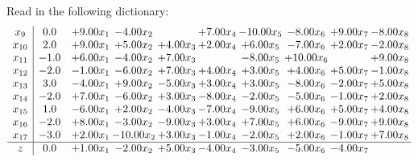 \documentclass[9pt]{article}
\begin{document}
Read in the following dictionary:
\[\begin{array}{c| c c@{\hskip 2pt} c@{\hskip 2pt} c@{\hskip 2pt} c@{\hskip 2pt} c@{\hskip 2pt} c@{\hskip 2pt} c@{\hskip 2pt} c@{\hskip 2pt} }
 x_{9}   &  0.0 & +  9.00 x_{1} & -4.00 x_{2} &   & +  7.00 x_{4} & -10.00 x_{5} & -8.00 x_{6} & +  9.00 x_{7} & -8.00 x_{8}\\
 x_{10}   &  2.0 & +  9.00 x_{1} & +  5.00 x_{2} & +  4.00 x_{3} & +  2.00 x_{4} & +  6.00 x_{5} & -7.00 x_{6} & +  2.00 x_{7} & -2.00 x_{8}\\
 x_{11}   &  -1.0 & +  6.00 x_{1} & -4.00 x_{2} & +  7.00 x_{3} &   & -8.00 x_{5} & + 10.00 x_{6} &   & +  9.00 x_{8}\\
 x_{12}   &  -2.0 & -1.00 x_{1} & -6.00 x_{2} & +  7.00 x_{3} & +  4.00 x_{4} & +  3.00 x_{5} & +  4.00 x_{6} & +  5.00 x_{7} & -1.00 x_{8}\\
 x_{13}   &  3.0 & -4.00 x_{1} & +  9.00 x_{2} & -5.00 x_{3} & +  3.00 x_{4} & +  3.00 x_{5} & -8.00 x_{6} & -2.00 x_{7} & +  5.00 x_{8}\\
 x_{14}   &  -2.0 & +  7.00 x_{1} & -6.00 x_{2} & +  3.00 x_{3} & -8.00 x_{4} & -2.00 x_{5} & -5.00 x_{6} & -1.00 x_{7} & +  2.00 x_{8}\\
 x_{15}   &  1.0 & -6.00 x_{1} & +  2.00 x_{2} & -4.00 x_{3} & -7.00 x_{4} & -9.00 x_{5} & +  6.00 x_{6} & +  5.00 x_{7} & +  4.00 x_{8}\\
 x_{16}   &  -2.0 & +  8.00 x_{1} & -3.00 x_{2} & -9.00 x_{3} & +  3.00 x_{4} & +  7.00 x_{5} & +  6.00 x_{6} & -9.00 x_{7} & +  9.00 x_{8}\\
 x_{17}   &  -3.0 & +  2.00 x_{1} & -10.00 x_{2} & +  3.00 x_{3} & -1.00 x_{4} & -2.00 x_{5} & +  2.00 x_{6} & -1.00 x_{7} & +  7.00 x_{8}\\
\hline
z    &  0.0 & +  1.00 x_{1} & -2.00 x_{2} & +  5.00 x_{3} & -4.00 x_{4} & -3.00 x_{5} & -5.00 x_{6} & -4.00 x_{7} &   \\
\end{array}\]
\end{document}
